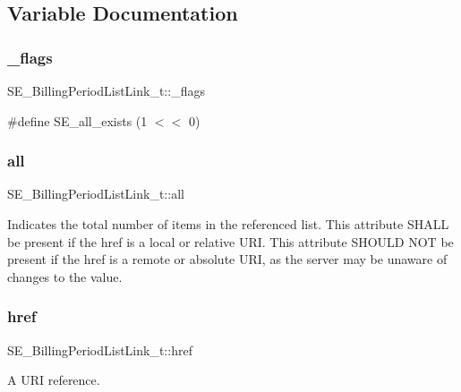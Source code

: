 \subsection{Variable Documentation}
\mbox{\label{group__BillingPeriodListLink_ga7caa40e6d3c99533fb043c648b6622a4}} 
\subsubsection{\texorpdfstring{\+\_\+flags}{\_flags}}
{\footnotesize\ttfamily S\+E\+\_\+\+Billing\+Period\+List\+Link\+\_\+t\+::\+\_\+flags}

\#define S\+E\+\_\+all\+\_\+exists (1 $<$$<$ 0) \mbox{\label{group__BillingPeriodListLink_ga6f46995c2700dabe61ac54cc90275c58}} 
\subsubsection{\texorpdfstring{all}{all}}
{\footnotesize\ttfamily S\+E\+\_\+\+Billing\+Period\+List\+Link\+\_\+t\+::all}

Indicates the total number of items in the referenced list. This attribute S\+H\+A\+LL be present if the href is a local or relative U\+RI. This attribute S\+H\+O\+U\+LD N\+OT be present if the href is a remote or absolute U\+RI, as the server may be unaware of changes to the value. \mbox{\label{group__BillingPeriodListLink_gaa205c380cc70507b95b3e88d00f99a15}} 
\subsubsection{\texorpdfstring{href}{href}}
{\footnotesize\ttfamily S\+E\+\_\+\+Billing\+Period\+List\+Link\+\_\+t\+::href}

A U\+RI reference. 